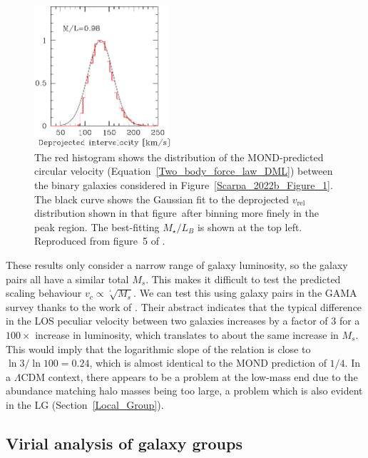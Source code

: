 \documentclass[fleqn,usenatbib,useAMS]{mnras} %
\begin{document}
\begin{figure}
	\centering
	\includegraphics[width=0.45\textwidth]{Scarpa_2022b_Figure_5}
	\caption{The red histogram shows the distribution of the MOND-predicted circular velocity (Equation~\ref{Two_body_force_law_DML}) between the binary galaxies considered in Figure~\ref{Scarpa_2022b_Figure_1}. The black curve shows the Gaussian fit to the deprojected $v_{\text{rel}}$ distribution shown in that figure~after binning more finely in the peak region. The best-fitting $M_\star/L_B$ is shown at the top left. Reproduced from figure~5 of \citet{Scarpa_2022b}.}
	\label{Scarpa_2022b_Figure_5}
\end{figure}

These results only consider a narrow range of galaxy luminosity, so the galaxy pairs all have a similar total $M_s$. This makes it difficult to test the predicted scaling behaviour $v_c \propto \sqrt[^4]{M_s}$. We can test this using galaxy pairs in the GAMA survey \citep{Driver_2011} thanks to the work of \citet{Loveday_2018}. Their abstract indicates that the typical difference in the LOS peculiar velocity between two galaxies increases by a factor of 3 for a $100\times$ increase in luminosity, which translates to about the same increase in $M_s$. This would imply that the logarithmic slope of the relation is close to $\ln 3/\ln 100 = 0.24$, which is almost identical to the MOND prediction of $1/4$. In a $\Lambda$CDM context, there appears to be a problem at the low-mass end due to the abundance matching halo masses being too large, a problem which is also evident in the LG (Section~\ref{Local_Group}).




\subsection{Virial analysis of galaxy groups}
\label{Galaxy_groups_sigma}
\end{document}
